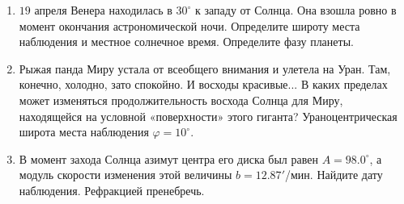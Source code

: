\documentclass[12pt]{article}
\begin{document}
\begin{enumerate}
        \item $19$ апреля Венера находилась в $30^{\circ}$ к западу от Солнца. Она взошла ровно в момент окончания астрономической ночи. Определите широту места наблюдения и местное солнечное время. Определите фазу планеты.
        \item Рыжая панда Миру устала от всеобщего внимания и улетела на Уран. Там, конечно, холодно, зато спокойно. И восходы красивые... В каких пределах может изменяться продолжительность восхода Солн­ца для Миру, находящейся на условной «поверхности» этого гиганта? Ураноцентрическая широта места наблюдения $\varphi = 10^{\circ}$.
        \item В момент захода Солнца азимут центра его диска был равен $A = 98.0^{\circ}$, а модуль скорости изменения этой величины $b = 12.87'$/мин. Найдите дату наблюдения. Рефракцией пренебречь.
 \end{enumerate}
\end{document}
